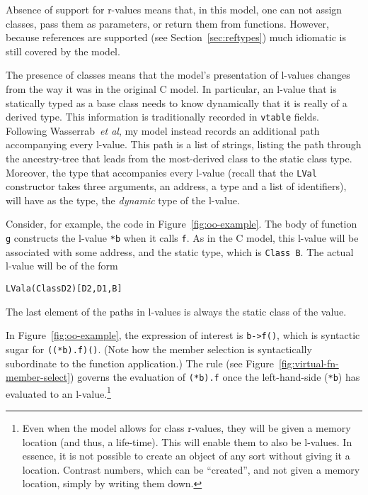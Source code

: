 \documentclass[11pt]{article}
\begin{document}
Absence of support for r-values means that, in this model, one can not
assign classes, pass them as parameters, or return them from
functions.  However, because references are supported (see
Section~\ref{sec:reftypes}) much idiomatic \cpp{} is still covered by
the model.

%
The presence of classes means that the model's presentation of
l-values changes from the way it was in the original C model.  In
particular, an l-value that is statically typed as a base class needs
to know dynamically that it is really of a derived type.  This
information is traditionally recorded in \texttt{vtable} fields.
Following Wasserrab~\emph{et al}, my model instead records an
additional path accompanying every l-value.  This path is a list of
strings, listing the path through the ancestry-tree that leads from
the most-derived class to the static class type.  Moreover, the type
that accompanies every l-value (recall that the \texttt{LVal}
constructor takes three arguments, an address, a type and a list of
identifiers), will have as the type, the \emph{dynamic} type
of the l-value.

Consider, for example, the code in Figure~\ref{fig:oo-example}.  The
body of function \texttt{g} constructs the l-value \texttt{*b} when it
calls \texttt{f}.  As in the C model, this l-value will be associated
with some address, and the static type, which is \texttt{Class~B}.
The actual l-value will be of the form
\begin{alltt}
   LVal a (Class D2) [D2,D1,B]
\end{alltt}
The last element of the paths in l-values is always the static class
of the value.

In Figure~\ref{fig:oo-example}, the expression of interest is
\texttt{b->f()}, which is syntactic sugar for \texttt{((*b).f)()}.
(Note how the member selection is syntactically subordinate to the
function application.)  The 
rule (see Figure~\ref{fig:virtual-fn-member-select}) governs the
evaluation of \texttt{(*b).f} once the left-hand-side (\texttt{*b})
has evaluated to an l-value.\footnote{Even when the model allows for
  class r-values, they will be given a memory location (and thus, a
  life-time).  This will enable them to also be l-values.  In essence,
  it is not possible to create an object of any sort without giving it
  a location.  Contrast numbers, which can be ``created'', and not
  given a memory location, simply by writing them down.}
\end{document}
